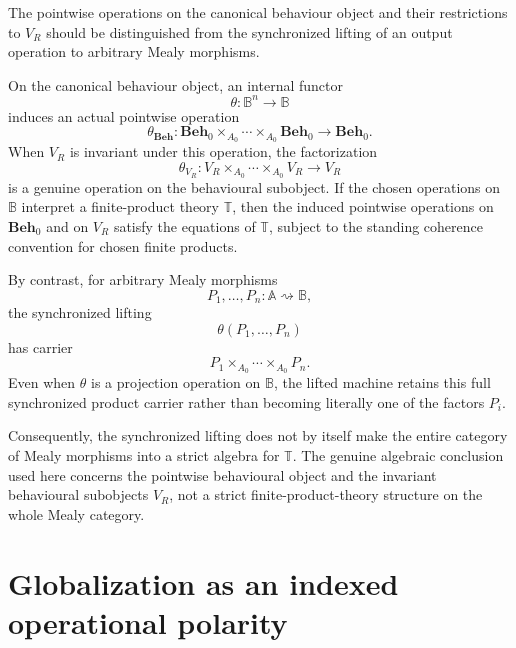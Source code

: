 \begin{remark}
\label{rem:to-pointwise-versus-synchronized-structure}
    The pointwise operations on the canonical behaviour object and their
    restrictions to \(V_R\) should be distinguished from the synchronized
    lifting of an output operation to arbitrary Mealy morphisms.

    On the canonical behaviour object, an internal functor
    \[
        \theta:\mathbb B^n\to\mathbb B
    \]
    induces an actual pointwise operation
    \[
        \theta_{\mathbf{Beh}}:
        \mathbf{Beh}_0
        \times_{A_0}\cdots\times_{A_0}
        \mathbf{Beh}_0
        \to
        \mathbf{Beh}_0.
    \]
    When \(V_R\) is invariant under this operation, the factorization
    \[
        \theta_{V_R}:
        V_R
        \times_{A_0}\cdots\times_{A_0}
        V_R
        \to
        V_R
    \]
    is a genuine operation on the behavioural subobject. If the chosen
    operations on \(\mathbb B\) interpret a finite-product theory
    \(\mathbb T\), then the induced pointwise operations on
    \(\mathbf{Beh}_0\) and on \(V_R\) satisfy the equations of
    \(\mathbb T\), subject to the standing coherence convention for chosen
    finite products.

    By contrast, for arbitrary Mealy morphisms
    \[
        P_1,\dots,P_n:
        \mathbb A\rightsquigarrow\mathbb B,
    \]
    the synchronized lifting
    \[
        \theta(P_1,\dots,P_n)
    \]
    has carrier
    \[
        P_1\times_{A_0}\cdots\times_{A_0}P_n.
    \]
    Even when \(\theta\) is a projection operation on \(\mathbb B\), the
    lifted machine retains this full synchronized product carrier rather than
    becoming literally one of the factors \(P_i\).

    Consequently, the synchronized lifting does not by itself make the
    entire category of Mealy morphisms into a strict algebra for
    \(\mathbb T\). The genuine algebraic conclusion used here concerns the
    pointwise behavioural object and the invariant behavioural subobjects
    \(V_R\), not a strict finite-product-theory structure on the whole Mealy
    category.
\end{remark}

\section{Globalization as an indexed operational polarity}
\label{sec:to-global-indexed-polarity}

